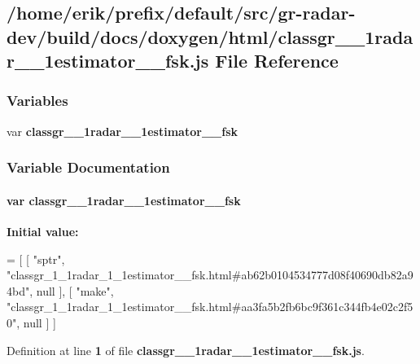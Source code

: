 \subsection{/home/erik/prefix/default/src/gr-\/radar-\/dev/build/docs/doxygen/html/classgr\+\_\+\_\+1radar\+\_\+\_\+1estimator\+\_\+\+\_\+fsk.js File Reference}
\label{classgr__1__1radar__1__1estimator____fsk_8js}
\subsubsection*{Variables}
\begin{DoxyCompactItemize}
\item 
var {\bf classgr\+\_\+\_\+1radar\+\_\+\_\+1estimator\+\_\+\+\_\+fsk}
\end{DoxyCompactItemize}


\subsubsection{Variable Documentation}
\paragraph[{classgr\+\_\+1\+\_\+1radar\+\_\+1\+\_\+1estimator\+\_\+\+\_\+fsk}]{\setlength{\rightskip}{0pt plus 5cm}var classgr\+\_\+\_\+1radar\+\_\+\_\+1estimator\+\_\+\+\_\+fsk}\label{classgr__1__1radar__1__1estimator____fsk_8js_a172e9de84989765791a42d22745a7924}
{\bfseries Initial value\+:}
\begin{DoxyCode}
=
[
    [ \textcolor{stringliteral}{"sptr"}, \textcolor{stringliteral}{"classgr\_1\_1radar\_1\_1estimator\_\_fsk.html#ab62b0104534777d08f40690db82a94bd"}, null ],
    [ \textcolor{stringliteral}{"make"}, \textcolor{stringliteral}{"classgr\_1\_1radar\_1\_1estimator\_\_fsk.html#aa3fa5b2fb6bc9f361c344fb4e02c2f50"}, null ]
]
\end{DoxyCode}


Definition at line {\bf 1} of file {\bf classgr\+\_\+\_\+1radar\+\_\+\_\+1estimator\+\_\+\+\_\+fsk.\+js}.

